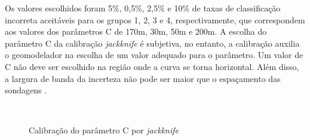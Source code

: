 Os valores escolhidos foram 5\%, 0,5\%, 2,5\% e 10\% de taxas de classificação incorreta aceitáveis para os grupos 1, 2, 3 e 4, respectivamente, que correspondem aos valores dos parâmetros C de 170m, 30m, 50m e 200m. A escolha do parâmetro C da calibração \textit{jackknife} é subjetiva, no entanto, a calibração auxilia o geomodelador na escolha de um valor adequado para o parâmetro. Um valor de C não deve ser escolhido na região onde a curva se torna horizontal. Além disso, a largura de banda da incerteza não pode ser maior que o espaçamento das sondagens \cite{rossi2013mineral}.

\begin{figure}[H]
    \caption{Calibração do parâmetro C por \textit{jackknife}} \label{fig:uncert_groups}
     \centering
     \\
\end{figure}


